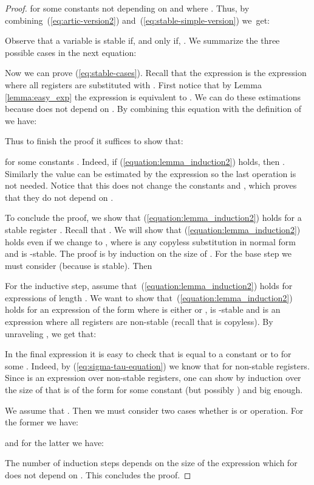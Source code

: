 \begin{proof}
for some constants  not depending on  and where . Thus, by combining~(\ref{eq:artic-version2}) and~(\ref{eq:stable-simple-version}) we~get:
\setlength{\jot}{4pt}

Observe that a variable  is stable if, and only if, . We summarize the three possible cases in the next equation:



Now we can prove (\ref{eq:stable-cases}). Recall that the expression  is the expression  where all registers  are substituted with .
First notice that by Lemma \ref{lemma:easy_exp} the expression  is equivalent to .  We can do these estimations because  does not depend on .
By combining this equation with the definition of  we have:

Thus to finish the proof it suffices to show that:

for some constants . Indeed, if (\ref{equation:lemma_induction2}) holds, then . Similarly the value  can be estimated by the expression   so the last  operation is not needed. Notice that this does not change the constants  and , which proves that they do not depend on .

To conclude the proof, we show that (\ref{equation:lemma_induction2}) holds for a stable register . 
Recall that . 
We will show that (\ref{equation:lemma_induction2}) holds even if we change  to , where  is any copyless substitution in normal form and  is -stable. 
The proof is by induction on the size of . For the base step we must consider  (because  is stable). Then

For the inductive step, assume that~(\ref{equation:lemma_induction2}) holds for expressions  of length . We want to show that~(\ref{equation:lemma_induction2}) holds for an expression  of the form  where  is either  or ,  is -stable and  is an expression where all registers are non-stable (recall that  is copyless).
By unraveling , we get that:

In the final expression it is easy to check that  is equal to a constant or to  for some .
Indeed,  by (\ref{eq:sigma-tau-equation}) we know that  for non-stable registers. Since  is an expression over non-stable registers, one can show by induction over the size of  that   is of the form  for some constant  (but possibly ) and  big enough.

We assume that . Then we must consider two cases whether  is  or  operation. For the former we have:

and for the latter we have:

The number of induction steps depends on the size of the expression  which for  does not depend on . This concludes the proof. 
\end{proof}





